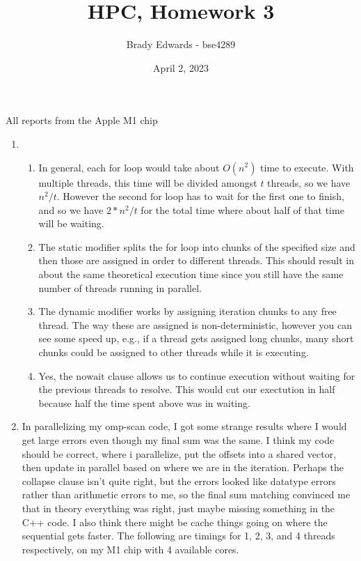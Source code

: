 \documentclass{article}
\title{HPC, Homework 3}
\author{Brady Edwards - bse4289}
\date{April 2, 2023}
\begin{document}
\maketitle
All reports from the Apple M1 chip
\begin{enumerate}
    \item 
    \begin{enumerate}
        \item In general, each $\mathrm{for}$ loop would take about $O(n^2)$ time to 
execute.  With multiple threads, this time will be divided amongst $t$ threads, so we 
have $n^2/t$.  However the second $\mathrm{for}$ loop has to wait for the first one to 
finish, and so we have $2*n^2/t$ for the total time where about half of that time will 
be waiting.

        \item The static modifier splits the for loop into chunks of the specified size 
and then those are assigned in order to different threads.  This should result in about 
the same theoretical execution time since you still have the same number of threads 
running in parallel.

        \item The dynamic modifier works by assigning iteration chunks to any free 
thread.  The way these are assigned is non-deterministic, however you can see some 
speed up, e.g., if a thread gets assigned long chunks, many short chunks could be 
assigned to other threads while it is executing.

        \item Yes, the $\mathrm{nowait}$ clause allows us to continue execution without 
waiting for the previous threads to resolve.  This would cut our exectution in half 
because half the time spent above was in waiting.
    \end{enumerate}

    \item In parallelizing my omp-scan code, I got some strange results where I would 
get large errors even though my final sum was the same.  I think my code should be 
correct, where i parallelize, put the offsets into a shared vector, then update in 
parallel based on where we are in the iteration.  Perhaps the collapse clause isn't 
quite right, but the errors looked like datatype errors rather than arithmetic errors 
to me, so the final sum matching convinced me that in theory everything was right, just 
maybe missing something in the C++ code.  I also think there might be cache things 
going on where the sequential gets faster.  The following are timings for 1, 2, 3, and 
4 threads respectively, on my M1 chip with 4 available cores.


\end{enumerate}
\end{document}
